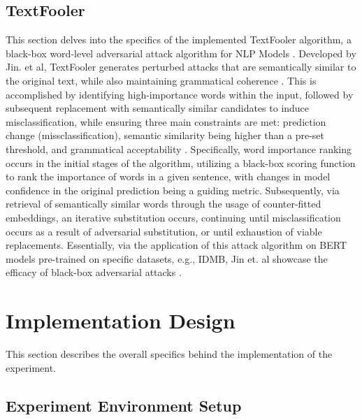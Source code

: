 \documentclass[conference]{IEEEtran}
\begin{document}
\subsection{TextFooler}

This section delves into the specifics of the implemented TextFooler algorithm, a black-box word-level adversarial attack algorithm for NLP Models \cite{jin2020bertrobust}. Developed by Jin. et al, TextFooler generates perturbed attacks that are semantically similar to the original text, while also maintaining grammatical coherence \cite{jin2020bertrobust}. This is accomplished by identifying high-importance words within the input, followed by subsequent replacement with semantically similar candidates to induce misclassification, while ensuring three main constraints are met: prediction change (missclassification), semantic similarity being higher than a pre-set threshold, and grammatical acceptability \cite{jin2020bertrobust} \cite{textattack2020framework}. Specifically, word importance ranking occurs in the initial stages of the algorithm, utilizing a black-box scoring function to rank the importance of words in a given sentence, with changes in model confidence in the original prediction being a guiding metric. Subsequently, via retrieval of semantically similar words through the usage of counter-fitted embeddings, an iterative substitution occurs, continuing until misclassification occurs as a result of adversarial substitution, or until exhaustion of viable replacements. Essentially, via the application of this attack algorithm on BERT models pre-trained on specific datasets, e.g., IDMB, Jin et. al showcase the efficacy of black-box adversarial attacks \cite{jin2020bertrobust, mrksic2016counterfitting}.

\section{Implementation Design}

This section describes the overall specifics behind the implementation of the experiment.

\subsection{Experiment Environment Setup}
\end{document}
